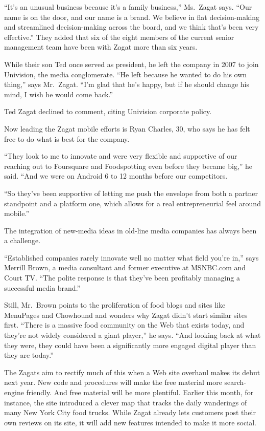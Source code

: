 ﻿\documentclass[12pt]{article}
\begin{document}
``It's an unusual business because it's a family business,'' Ms.~Zagat says. ``Our name is on the
door, and our name is a brand. We believe in flat decision-making and streamlined decision-making
across the board, and we think that's been very effective.'' They added that six of the eight
members of the current senior management team have been with Zagat more than six years.

While their son Ted once served as president, he left the company in 2007 to join Univision, the
media conglomerate. ``He left because he wanted to do his own thing,'' says Mr.~Zagat. ``I'm glad
that he's happy, but if he should change his mind, I wish he would come back.''

Ted Zagat declined to comment, citing Univision corporate policy.

Now leading the Zagat mobile efforts is Ryan Charles, 30, who says he has felt free to do what is
best for the company.

``They look to me to innovate and were very flexible and supportive of our reaching out to
Foursquare and Foodspotting even before they became big,'' he said. ``And we were on Android 6 to 12
months before our competitors.

``So they've been supportive of letting me push the envelope from both a partner standpoint and a
platform one, which allows for a real entrepreneurial feel around mobile.''

The integration of new-media ideas in old-line media companies has always been a challenge.

``Established companies rarely innovate well no matter what field you're in,'' says Merrill Brown, a
media consultant and former executive at MSNBC.com and Court TV. ``The polite response is that
they've been profitably managing a successful media brand.''

Still, Mr.~Brown points to the proliferation of food blogs and sites like MenuPages and Chowhound
and wonders why Zagat didn't start similar sites first. ``There is a massive food community on the
Web that exists today, and they're not widely considered a giant player,'' he says. ``And looking
back at what they were, they could have been a significantly more engaged digital player than they
are today.''

The Zagats aim to rectify much of this when a Web site overhaul makes its debut next year. New code
and procedures will make the free material more search-engine friendly. And free material will be
more plentiful. Earlier this month, for instance, the site introduced a clever map that tracks the
daily wanderings of many New York City food trucks. While Zagat already lets customers post their
own reviews on its site, it will add new features intended to make it more social.
\end{document}
